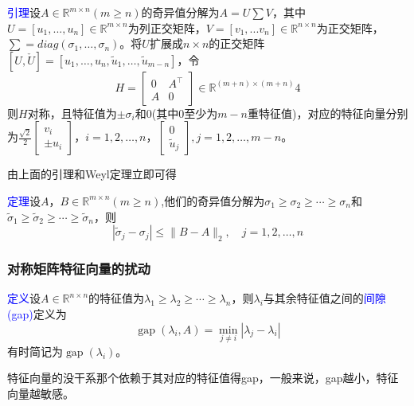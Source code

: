 \documentclass[12pt,a4paper]{article}
\begin{document}
\textcolor{blue}{引理}\quad 设$A \in \mathbb{R}^{m \times n}(m \geq n)$的奇异值分解为$A=U\sum V$，其中$U=[u_1,...,u_n]\in \mathbb{R}^{m \times n}$为列正交矩阵，$V=[v_1,...v_n]\in \mathbb{R}^{n \times n}$为正交矩阵，$\sum =diag(\sigma_{1}, \ldots, \sigma_{n})$。将$U$扩展成$n\times n$的正交矩阵$[U, \check{U}]=\left[u_{1}, \dots, u_{n}, \tilde{u}_{1}, \ldots, \tilde{u}_{m-n}\right]$，令$$
H=\left[\begin{array}{cc}{0} & {A^{\top}} \\ {A} & {0}\end{array}\right] \in \mathbb{R}^{(m+n) \times(m+n)}
4
$$则$H$对称，且特征值为$\pm \sigma_{i}$和$0$(其中$0$至少为$m-n$重特征值)，对应的特征向量分别为$\frac{\sqrt{2}}{2}\left[\begin{array}{c}{v_{i}} \\ { \pm u_{i}}\end{array}\right]$，$i=1,2, \dots, n$，$\left[\begin{array}{c}{0} \\ {\tilde{u}_{j}}\end{array}\right], j=1,2, \ldots, m-n$。

由上面的引理和Weyl定理立即可得

\textcolor{blue}{定理}\quad 设$A，B\in \mathbb{R}^{m \times n}(m \geq n)$,他们的奇异值分解为$\sigma_{1} \geq \sigma_{2} \geq \cdots \geq \sigma_{n}$和$\tilde{\sigma}_{1} \geq \tilde{\sigma}_{2} \geq \cdots \geq \tilde{\sigma}_{n}$，则$$
\left|\tilde{\sigma}_{j}-\sigma_{j}\right| \leq\|B-A\|_{2}, \quad j=1,2, \ldots, n
$$
\subsubsection{对称矩阵特征向量的扰动}
\textcolor{blue}{定义}\quad 设$A\in \mathbb{R}^{n \times n}$的特征值为$\lambda_{1} \geq \lambda_{2} \geq \cdots \geq \lambda_{n}$，则$\lambda_{i}$与其余特征值之间的\textcolor{blue}{间隙(gap)}定义为
$$
\operatorname{gap}\left(\lambda_{i}, A\right)=\min _{j \neq i}\left|\lambda_{j}-\lambda_{i}\right|
$$有时简记为$
\operatorname{gap}(\lambda_{i})$。

特征向量的没干系那个依赖于其对应的特征值得gap，一般来说，gap越小，特征向量越敏感。
\end{document}
